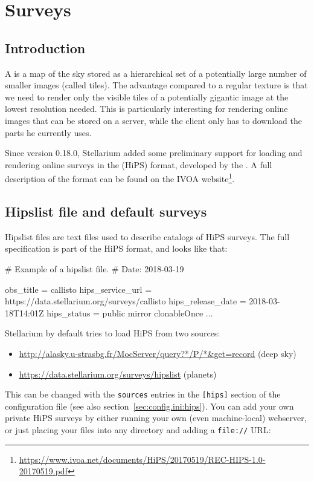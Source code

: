 
\chapter{Surveys}
\label{ch:surveys}

\section{Introduction}
\label{sec:surveys:introduction}


A   is a map of the sky stored as a hierarchical set of a potentially
large number of smaller images (called tiles).  The advantage compared to a
regular texture is that we need to render only the visible tiles of a potentially gigantic image at the
lowest resolution needed.  This is particularly interesting for rendering
online images that can be stored on a server, while the client only has
to download the parts he currently uses.

Since version 0.18.0, Stellarium added some preliminary support for loading and
rendering online surveys in the  (HiPS) format,
developed by the .
A full description of the format can be found on the IVOA website\footnote{%
\url{https://www.ivoa.net/documents/HiPS/20170519/REC-HIPS-1.0-20170519.pdf}}.

\section{Hipslist file and default surveys}
\label{sec:surveys:hipslistFile}

Hipslist files are text files used to describe catalogs of HiPS surveys.  The
full specification is part of the HiPS format, and looks like that:

\begin{configfileScr}
# Example of a hipslist file.
# Date: 2018-03-19

obs_title         = callisto
hips_service_url  = https://data.stellarium.org/surveys/callisto
hips_release_date = 2018-03-18T14:01Z
hips_status       = public mirror clonableOnce
...
\end{configfileScr}

Stellarium by default tries to load HiPS from two sources:
\begin{itemize}
\item\url{http://alasky.u-strasbg.fr/MocServer/query?*/P/*&get=record} (deep sky)
\item\url{https://data.stellarium.org/surveys/hipslist} (planets)
\end{itemize}
This can be changed with the \texttt{sources} entries in the \texttt{[hips]} section of the configuration
file (see also section~\ref{sec:config.ini:hips}).  You can add your
own private HiPS surveys by either running your own (even machine-local) webserver, 
or just placing your files into any directory and adding a \texttt{file://} URL:

